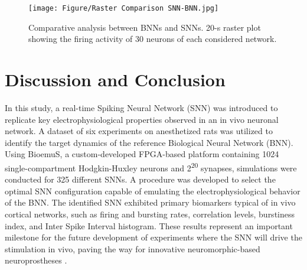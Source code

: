 \begin{figure}[ht!]
    \begin{center}
    \texttt{[image: Figure/Raster Comparison SNN-BNN.jpg]}
    \end{center}
    \caption{Comparative analysis between BNNs and SNNs. 20-s raster plot showing the firing activity of 30 neurons of each considered network.}
    \label{fig:Raster Comparison SNN-BNN}
\end{figure}

\section{Discussion and Conclusion}

In this study, a real-time Spiking Neural Network (SNN) was introduced to replicate key electrophysiological properties observed in an in vivo neuronal network. A dataset of six experiments on anesthetized rats was utilized to identify the target dynamics of the reference Biological Neural Network (BNN). Using BioemuS, a custom-developed FPGA-based platform containing 1024 single-compartment Hodgkin-Huxley neurons and 2\textsuperscript{20} synapses, simulations were conducted for 325 different SNNs. A procedure was developed to select the optimal SNN configuration capable of emulating the electrophysiological behavior of the BNN. The identified SNN exhibited primary biomarkers typical of in vivo cortical networks, such as firing and bursting rates, correlation levels, burstiness index, and Inter Spike Interval histogram. These results represent an important milestone for the future development of experiments where the SNN will drive the stimulation in vivo, paving the way for innovative neuromorphic-based neuroprostheses \cite{Chiappalone2022}.